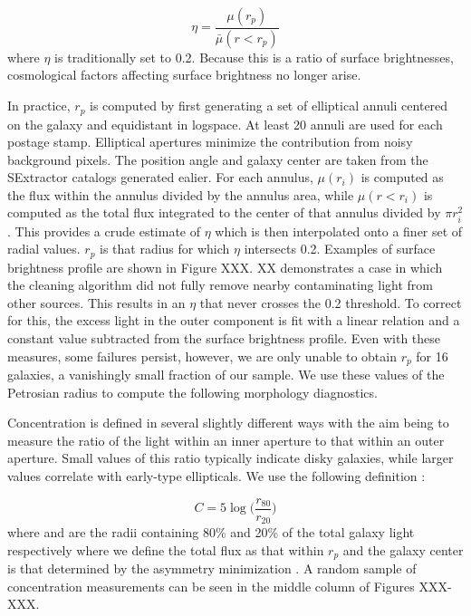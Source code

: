 \begin{equation}
\eta = \frac{\mu(r_p)}{\bar\mu(r<r_p)}
\end{equation}
where $\eta$ is traditionally set to 0.2. Because this is a ratio of surface brightnesses, cosmological factors affecting surface brightness no longer arise. 

In practice, $r_p$ is computed by first generating a set of elliptical annuli centered on the galaxy and equidistant in logspace. At least 20 annuli are used for each postage stamp. Elliptical apertures minimize the contribution from noisy background pixels. The position angle and galaxy center are taken from the SExtractor catalogs generated ealier. For each annulus, $\mu(r_i)$ is computed as the flux within the annulus divided by the annulus area, while $\mu(r<r_i)$ is computed as the total flux integrated to the center of that annulus divided by $\pi r_i^2$. This provides a crude estimate of $\eta$ which is then interpolated onto a finer set of radial values.  $r_p$ is that radius for which $\eta$ intersects 0.2. Examples of surface brightness profile are shown in Figure XXX. XX demonstrates a case in which the cleaning algorithm did not fully remove nearby contaminating light from other sources. This results in an $\eta$ that never crosses the 0.2 threshold. To correct for this, the excess light in the outer component is fit with a linear relation and a constant value subtracted from the surface brightness profile. Even with these measures, some failures persist, however, we are only unable to obtain $r_p$ for 16 galaxies, a vanishingly small fraction of our sample. We use these values of the Petrosian radius to compute the following morphology diagnostics.


Concentration is defined in several slightly different ways with the aim being to measure the ratio of the light within an inner aperture to that within an outer aperture. Small values of this ratio typically indicate disky galaxies, while larger values correlate with early-type ellipticals. We use the following definition \citep{Bershady2000}:

\begin{equation}{}
C = 5\log\Big(\frac{r_{80}}{r_{20}}\Big) 
\end{equation}
where  and  are the radii containing 80\% and 20\% of the total galaxy light respectively where we define the total flux as that within $r_p$ and the galaxy center is that determined by the asymmetry minimization \cite[described below,][]{Lotz2004}. A random sample of concentration measurements can be seen in the middle column of Figures XXX-XXX. 

